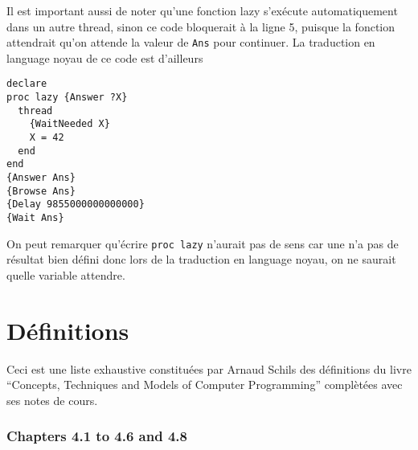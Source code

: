 Il est important aussi de noter qu'une fonction lazy s'exécute automatiquement dans un autre thread, sinon
ce code bloquerait à la ligne 5, puisque la fonction attendrait qu'on attende la valeur de \lstinline|Ans| pour continuer.
La traduction en language noyau de ce code est d'ailleurs
\begin{lstlisting}
declare
proc lazy {Answer ?X}
  thread
    {WaitNeeded X}
    X = 42
  end
end
{Answer Ans}
{Browse Ans}
{Delay 9855000000000000}
{Wait Ans}
\end{lstlisting}

On peut remarquer qu'écrire \lstinline|proc lazy| n'aurait pas de sens car une n'a pas de résultat bien défini donc lors de la traduction
en language noyau, on ne saurait quelle variable attendre.

\part{Définitions}
Ceci est une liste exhaustive constituées par Arnaud Schils
des définitions du livre
``Concepts, Techniques and Models of Computer Programming''
complètées avec ses notes de cours.

\section{Chapters 4.1 to 4.6 and 4.8}

